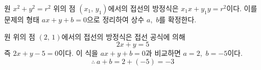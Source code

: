 \documentclass[10pt]{article}
\begin{document}
\begin{dmapproach}
원 $x^2 + y^2 = r^2$ 위의 점 $(x_1,\, y_1)$에서의 접선의 방정식은 $x_1 x + y_1 y = r^2$이다. 이를 문제의 형태 $ax + y + b = 0$으로 정리하여 상수 $a$,\ $b$를 확정한다.
\end{dmapproach}

\begin{dmsolution}
원 위의 점 $(2,\, 1)$에서의 접선의 방정식은 접선 공식에 의해
\begin{equation*}
  2x + y = 5
\end{equation*}
즉 $2x + y - 5 = 0$이다. 이 식을 $ax + y + b = 0$과 비교하면 $a = 2$,\ $b = -5$이다.
\begin{equation*}
  \therefore\ a + b = 2 + (-5) = -3
\end{equation*}
\end{dmsolution}

\dmchecktitle



\newpage

\dmconcepthead
{}
\end{document}
